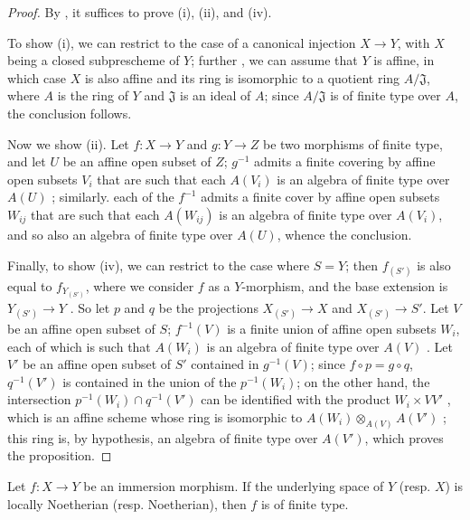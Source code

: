 \begin{proof}
By , it suffices to prove (i), (ii), and (iv).

To show (i), we can restrict to the case of a canonical injection $X\to Y$, with $X$ being a closed subprescheme of $Y$;
further , we can assume that $Y$ is affine, in which case $X$ is also affine  and its ring is isomorphic to a quotient ring $A/\mathfrak{J}$, where $A$ is the ring of $Y$ and $\mathfrak{J}$ is an ideal of $A$;
since $A/\mathfrak{J}$ is of finite type over $A$, the conclusion follows.

Now we show (ii).
Let $f:X\to Y$ and $g:Y\to Z$ be two morphisms of finite type, and let $U$ be an affine open subset of $Z$;
$g^{-1}$ admits a finite covering by affine open subsets $V_i$ that are such that each $A(V_i)$ is an algebra of finite type over $A(U)$ ;
similarly. each
of the $f^{-1}$ admits a finite cover by affine open subsets $W_{ij}$ that are such that each $A(W_{ij})$ is an algebra of finite type over $A(V_i)$, and so also an algebra of finite type over $A(U)$, whence the conclusion.

Finally, to show (iv), we can restrict to the case where $S=Y$;
then $f_{(S')}$ is also equal to $f_{Y_{(S')}}$, where we consider $f$ as a $Y$-morphism, and the base extension is $Y_{(S')}\to Y$ .
So let $p$ and $q$ be the projections $X_{(S')}\to X$ and $X_{(S')}\to S'$.
Let $V$ be an affine open subset of $S$;
$f^{-1}(V)$ is a finite union of affine open subsets $W_i$, each of which is such that $A(W_i)$ is an algebra of finite type over $A(V)$ .
Let $V'$ be an affine open subset of $S'$ contained in $g^{-1}(V)$;
since $f\circ p=g\circ q$, $q^{-1}(V')$ is contained in the union of the $p^{-1}(W_i)$;
on the other hand, the intersection $p^{-1}(W_i)\cap q^{-1}(V')$ can be identified with the product $W_i\times V V'$ , which is an affine scheme whose ring is isomorphic to $A(W_i)\otimes_{A(V)}A(V')$ ;
this ring is, by hypothesis, an algebra of finite type over $A(V')$, which proves the proposition.
\end{proof}

\begin{corollary}[6.3.5]
\label{I.6.3.5}
Let $f:X\to Y$ be an immersion morphism.
If the underlying space of $Y$ (resp. $X$) is locally Noetherian (resp. Noetherian), then $f$ is of finite type.
\end{corollary}

